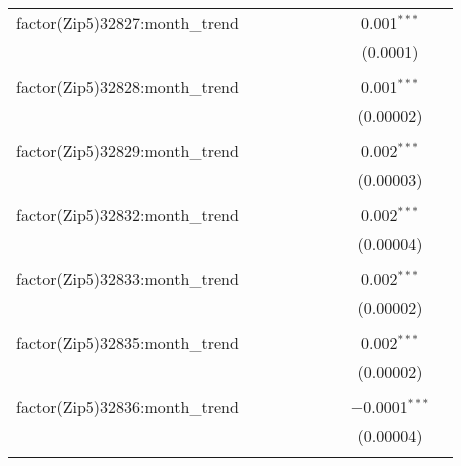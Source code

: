 \begin{table}[H]
{\begin{tabular}{@{\extracolsep{5pt}}lcccccccc}
  factor(Zip5)32827:month\_trend &  &  &  &  &  &  & 0.001$^{***}$ &  \\  

   &  &  &  &  &  &  & (0.0001) &  \\  

   & & & & & & & & \\  

  factor(Zip5)32828:month\_trend &  &  &  &  &  &  & 0.001$^{***}$ &  \\  

   &  &  &  &  &  &  & (0.00002) &  \\  

   & & & & & & & & \\  

  factor(Zip5)32829:month\_trend &  &  &  &  &  &  & 0.002$^{***}$ &  \\  

   &  &  &  &  &  &  & (0.00003) &  \\  

   & & & & & & & & \\  

  factor(Zip5)32832:month\_trend &  &  &  &  &  &  & 0.002$^{***}$ &  \\  

   &  &  &  &  &  &  & (0.00004) &  \\  

   & & & & & & & & \\  

  factor(Zip5)32833:month\_trend &  &  &  &  &  &  & 0.002$^{***}$ &  \\  

   &  &  &  &  &  &  & (0.00002) &  \\  

   & & & & & & & & \\  

  factor(Zip5)32835:month\_trend &  &  &  &  &  &  & 0.002$^{***}$ &  \\  

   &  &  &  &  &  &  & (0.00002) &  \\  

   & & & & & & & & \\  

  factor(Zip5)32836:month\_trend &  &  &  &  &  &  & $-$0.0001$^{***}$ &  \\  

   &  &  &  &  &  &  & (0.00004) &  \\  

   & & & & & & & & \\  


\end{tabular}}
\end{table}
